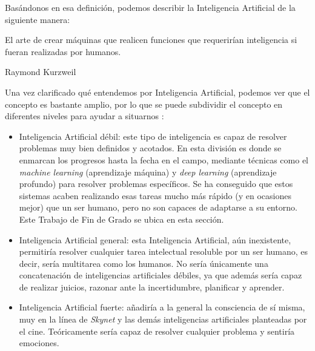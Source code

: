 \documentclass[../main.tex]{subfiles}
\begin{document}
Basándonos en esa definición, podemos describir la Inteligencia Artificial de la siguiente manera:

 \begin{center}
    \begin{minipage}{0.9\linewidth}
        \vspace{5pt}%
        {\small
            El arte de crear máquinas que realicen funciones que requerirían inteligencia si fueran realizadas por humanos.
        }
        \begin{flushright} Raymond Kurzweil \cite{Garcia2012}
        \end{flushright}
        \vspace{3pt}%
    \end{minipage}
\end{center}

Una vez clarificado qué entendemos por Inteligencia Artificial, podemos ver que el concepto es bastante amplio, por lo que se puede subdividir el concepto en diferentes niveles para ayudar a situarnos \cite{Pastor2018}:

\begin{itemize}
    \item Inteligencia Artificial débil: este tipo de inteligencia es capaz de resolver problemas muy bien definidos y acotados. En esta división es donde se enmarcan los progresos hasta la fecha en el campo, mediante técnicas como el \textit{machine learning} (aprendizaje máquina) y \textit{deep learning} (aprendizaje profundo) para resolver problemas específicos. Se ha conseguido que estos sistemas acaben realizando esas tareas mucho más rápido (y en ocasiones mejor) que un ser humano, pero no son capaces de adaptarse a su entorno. Este Trabajo de Fin de Grado se ubica en esta sección.
    \item Inteligencia Artificial general: esta Inteligencia Artificial, aún inexistente, permitiría resolver cualquier tarea intelectual resoluble por un ser humano, es decir, sería multitarea como los humanos. No sería únicamente una concatenación de inteligencias artificiales débiles, ya que además sería capaz de realizar juicios, razonar ante la incertidumbre, planificar y aprender.
    \item Inteligencia Artificial fuerte: añadiría a la general la consciencia de sí misma, muy en la línea de \textit{Skynet} y las demás inteligencias artificiales planteadas por el cine. Teóricamente sería capaz de resolver cualquier problema y sentiría emociones.
\end{itemize}
\end{document}
